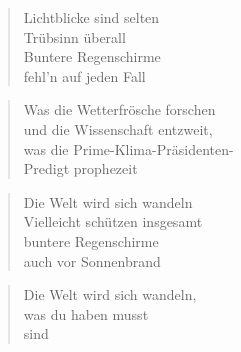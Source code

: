 \documentclass[9pt,a4paper,oneside, onecolumn]{article}
\begin{document}
\begin{verse}
\qquad Lichtblicke sind selten\\
\qquad Trübsinn überall\\
\qquad Buntere Regenschirme\\
\qquad fehl'n auf jeden Fall\\
\end{verse}

\begin{verse}
Was die Wetterfrösche forschen\\
und die Wissenschaft entzweit,\\
was die Prime-Klima-Präsidenten-\\
Predigt prophezeit\\
\end{verse}

\begin{verse}
Die Welt wird sich wandeln\\
Vielleicht schützen insgesamt\\
buntere Regenschirme\\
auch vor Sonnenbrand\\
\end{verse}

\begin{verse}
\qquad Die Welt wird sich wandeln,\\
\qquad was du haben musst\\
\qquad sind \\
\end{verse}

\end{document}
